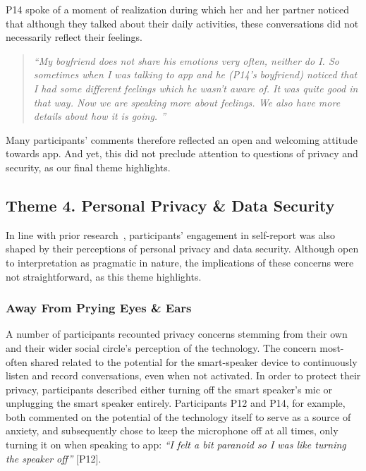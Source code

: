             P14 spoke of a moment of realization during which her and her partner noticed that although they talked about their daily activities, these conversations did not necessarily reflect their feelings. 
            
                \begin{quote}
                \vspace{2mm}
                    \textit{``My boyfriend does not share his emotions very often, neither do I. 
                    So sometimes when I was talking to \acl{app} and he (P14's boyfriend) noticed that I had some different feelings which he wasn't aware of. It was quite good in that way. Now we are speaking more about feelings. 
                    We also have more details about how it is going. 
                    ''}
                \vspace{2mm}
                \end{quote} 
                
            Many participants' comments therefore reflected an open and welcoming attitude towards \acl{app}. And yet, this did not preclude attention to questions of privacy and security, as our final theme highlights.

    \subsection{Theme 4. Personal Privacy \& Data Security}\label{sec:privacy}
    
        In line with prior research~\cite{lau2018alexa}, participants' engagement in self-report was also shaped by their perceptions of personal privacy and data security. Although open to interpretation as pragmatic in nature, the implications of these concerns were not straightforward, as this theme highlights.   
        
        \subsubsection{Away From Prying Eyes \& Ears}\label{sec:eavesdropping} %
        
            A number of participants recounted privacy concerns stemming from their own and their wider social circle's perception of the technology. The concern most-often shared related to the potential for the smart-speaker device to continuously listen and record conversations, even when not activated. In order to protect their privacy, participants described either turning off the smart speaker's mic or unplugging the smart speaker entirely. Participants P12 and P14, for example, both commented on the potential of the technology itself to serve as a source of anxiety, and subsequently chose to keep the microphone off at all times, only turning it on when speaking to \acl{app}: \textit{``I felt a bit paranoid so I was like turning the speaker off''} [P12].
   
